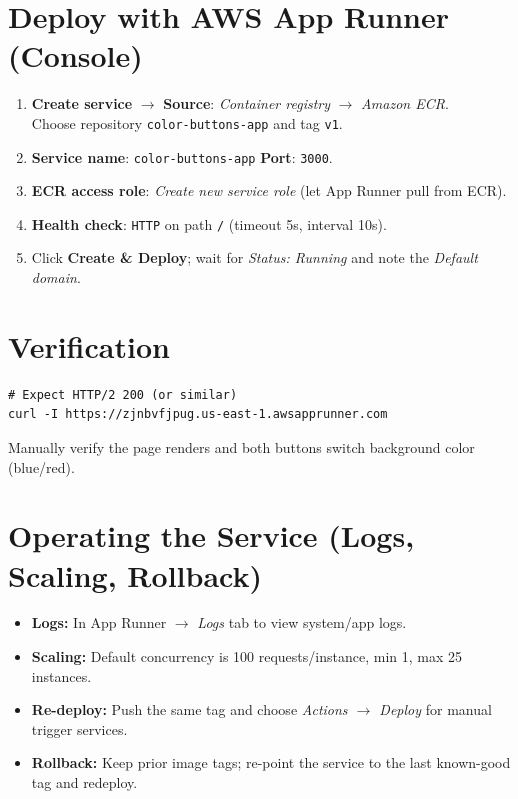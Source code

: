 \section*{Deploy with AWS App Runner (Console)}
\begin{enumerate}
  \item \textbf{Create service} $\rightarrow$ \textbf{Source}: \emph{Container registry} $\rightarrow$ \emph{Amazon ECR}.\\
        Choose repository \texttt{color-buttons-app} and tag \texttt{v1}.
  \item \textbf{Service name}: \texttt{color-buttons-app} \quad \textbf{Port}: \texttt{3000}.
  \item \textbf{ECR access role}: \emph{Create new service role} (let App Runner pull from ECR).
  \item \textbf{Health check}: \texttt{HTTP} on path \texttt{/} (timeout 5s, interval 10s).
  \item Click \textbf{Create \& Deploy}; wait for \emph{Status: Running} and note the \emph{Default domain}.
\end{enumerate}

\section*{Verification}
\begin{verbatim}
# Expect HTTP/2 200 (or similar)
curl -I https://zjnbvfjpug.us-east-1.awsapprunner.com
\end{verbatim}
Manually verify the page renders and both buttons switch background color (blue/red).

\section*{Operating the Service (Logs, Scaling, Rollback)}
\begin{itemize}
  \item \textbf{Logs:} In App Runner $\rightarrow$ \emph{Logs} tab to view system/app logs.
  \item \textbf{Scaling:} Default concurrency is 100 requests/instance, min 1, max 25 instances.
  \item \textbf{Re-deploy:} Push the same tag and choose \emph{Actions $\rightarrow$ Deploy} for manual trigger services.
  \item \textbf{Rollback:} Keep prior image tags; re-point the service to the last known-good tag and redeploy.
\end{itemize}

